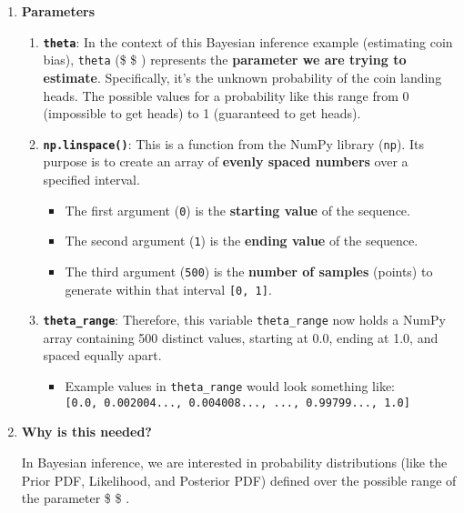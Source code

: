 \documentclass[11pt]{article}
\providecommand{\tightlist}{%
      \setlength{\itemsep}{0pt}\setlength{\parskip}{0pt}}
\begin{document}
    \begin{enumerate}
\def\labelenumi{\arabic{enumi}.}
\item
  \textbf{Parameters}

  \begin{enumerate}
  \def\labelenumii{\arabic{enumii}.}
  \item
    \textbf{\texttt{theta}}: In the context of this Bayesian inference
    example (estimating coin bias), \texttt{theta} (\$ \theta \$ )
    represents the \textbf{parameter we are trying to estimate}.
    Specifically, it's the unknown probability of the coin landing
    heads. The possible values for a probability like this range from 0
    (impossible to get heads) to 1 (guaranteed to get heads).
  \item
    \textbf{\texttt{np.linspace()}}: This is a function from the NumPy
    library (\texttt{np}). Its purpose is to create an array of
    \textbf{evenly spaced numbers} over a specified interval.

    \begin{itemize}
    \tightlist
    \item
      The first argument (\texttt{0}) is the \textbf{starting value} of
      the sequence.
    \item
      The second argument (\texttt{1}) is the \textbf{ending value} of
      the sequence.
    \item
      The third argument (\texttt{500}) is the \textbf{number of
      samples} (points) to generate within that interval
      \texttt{{[}0,\ 1{]}}.
    \end{itemize}
  \item
    \textbf{\texttt{theta\_range}}: Therefore, this variable
    \texttt{theta\_range} now holds a NumPy array containing 500
    distinct values, starting at 0.0, ending at 1.0, and spaced equally
    apart.

    \begin{itemize}
    \tightlist
    \item
      Example values in \texttt{theta\_range} would look something like:
      \texttt{{[}0.0,\ 0.002004...,\ 0.004008...,\ ...,\ 0.99799...,\ 1.0{]}}
    \end{itemize}
  \end{enumerate}
\item
  \textbf{Why is this needed?}

  In Bayesian inference, we are interested in probability distributions
  (like the Prior PDF, Likelihood, and Posterior PDF) defined over the
  possible range of the parameter \$ \theta \$ .


\end{enumerate}
\end{document}
